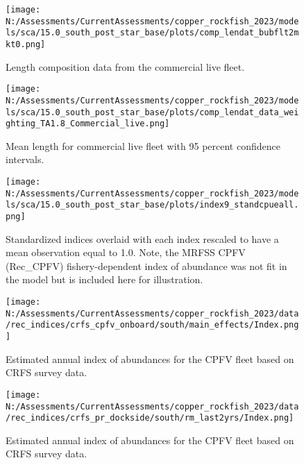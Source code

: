 \documentclass[11pt,
  english,
  letterpaper,
]{article}
\begin{document}
\pagebreak

\begin{figure}
\centering
\texttt{[image: N:/Assessments/CurrentAssessments/copper\_rockfish\_2023/models/sca/15.0\_south\_post\_star\_base/plots/comp\_lendat\_bubflt2mkt0.png]}
\caption{Length composition data from the commercial live fleet.\label{fig:com-live-len-data}}
\end{figure}

\pagebreak

\begin{figure}
\centering
\texttt{[image: N:/Assessments/CurrentAssessments/copper\_rockfish\_2023/models/sca/15.0\_south\_post\_star\_base/plots/comp\_lendat\_data\_weighting\_TA1.8\_Commercial\_live.png]}
\caption{Mean length for commercial live fleet with 95 percent confidence intervals.\label{fig:mean-com-live-len-data}}
\end{figure}

\pagebreak

\begin{figure}
\centering
\texttt{[image: N:/Assessments/CurrentAssessments/copper\_rockfish\_2023/models/sca/15.0\_south\_post\_star\_base/plots/index9\_standcpueall.png]}
\caption{Standardized indices overlaid with each index rescaled to have a mean observation equal to 1.0. Note, the MRFSS CPFV (Rec\_CPFV) fishery-dependent index of abundance was not fit in the model but is included here for illustration.\label{fig:stand-cpue}}
\end{figure}

\pagebreak

\begin{figure}
\centering
\texttt{[image: N:/Assessments/CurrentAssessments/copper\_rockfish\_2023/data/rec\_indices/crfs\_cpfv\_onboard/south/main\_effects/Index.png]}
\caption{Estimated annual index of abundances for the CPFV fleet based on CRFS survey data.\label{fig:crfs-index-main}}
\end{figure}

\pagebreak

\begin{figure}
\centering
\texttt{[image: N:/Assessments/CurrentAssessments/copper\_rockfish\_2023/data/rec\_indices/crfs\_pr\_dockside/south/rm\_last2yrs/Index.png]}
\caption{Estimated annual index of abundances for the CPFV fleet based on CRFS survey data.\label{fig:crfs-pr-index-main}}
\end{figure}
\end{document}
